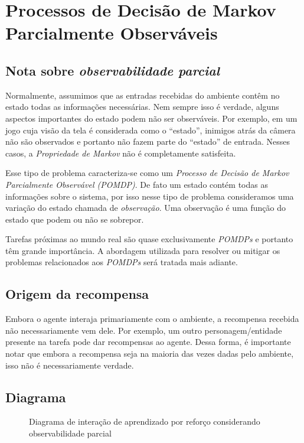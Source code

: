 \documentclass{article}
\begin{document}
    \section{Processos de Decisão de Markov Parcialmente Observáveis}
    
        \subsection{Nota sobre \emph{observabilidade parcial}}

            Normalmente, assumimos que as entradas recebidas do ambiente contêm no estado todas as informações necessárias. Nem sempre isso é verdade, alguns aspectos importantes do estado podem não ser observáveis. Por exemplo, em um jogo cuja visão da tela é considerada como o ``estado'', inimigos atrás da câmera não são observados e portanto não fazem parte do ``estado'' de entrada. Nesses casos, a \emph{Propriedade de Markov} não é completamente satisfeita. 
            
            Esse tipo de problema caracteriza-se como um \emph{Processo de Decisão de Markov Parcialmente Observável (POMDP)}. De fato um estado contém todas as informações sobre o sistema, por isso nesse tipo de problema consideramos uma variação do estado chamada de \emph{observação}. Uma observação é uma função do estado que podem ou não se sobrepor.
            
            Tarefas próximas ao mundo real são quase exclusivamente \emph{POMDPs} e portanto têm grande importância. A abordagem utilizada para resolver ou mitigar os problemas relacionados aos \emph{POMDPs} será tratada mais adiante.

        \subsection{Origem da recompensa}
        
            Embora o agente interaja primariamente com o ambiente, a recompensa recebida não necessariamente vem dele. Por exemplo, um outro personagem/entidade presente na tarefa pode dar recompensas ao agente. Dessa forma, é importante notar que embora a recompensa seja na maioria das vezes dadas pelo ambiente, isso não é necessariamente verdade.

        \subsection{Diagrama}

            \begin{figure}[ht]
                \centering
                \rlinteractionpomdp
                \caption{Diagrama de interação de aprendizado por reforço considerando observabilidade parcial}
                \label{diag:po-rl}
            \end{figure}
\end{document}
